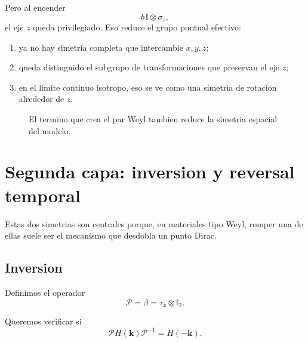 Pero al encender
\begin{equation}
b\,\mathbb{I}\otimes \sigma_z,
\end{equation}
el eje \(z\) queda privilegiado. Eso reduce el grupo puntual efectivo:
\begin{enumerate}[label=\arabic*.]
    \item ya no hay simetria completa que intercambie \(x,y,z\);
    \item queda distinguido el subgrupo de transformaciones que preservan el eje \(z\);
    \item en el limite continuo isotropo, eso se ve como una simetria de rotacion alrededor de \(z\).
\end{enumerate}

\begin{figure}[h!]
\centering
{}
\caption{El termino que crea el par Weyl tambien reduce la simetria espacial del modelo.}
\end{figure}

\section{Segunda capa: inversion y reversal temporal}
Estas dos simetrias son centrales porque, en materiales tipo Weyl, romper una de ellas suele ser el mecanismo que desdobla un punto Dirac.

\subsection{Inversion}
Definimos el operador
\begin{equation}
\mathcal{P}=\beta=\tau_x\otimes \mathbb{I}_2.
\label{c11:eq:P}
\end{equation}

Queremos verificar si
\begin{equation}
\mathcal{P}H(\bm{k})\mathcal{P}^{-1}=H(-\bm{k}).
\label{c11:eq:Pinv}
\end{equation}


